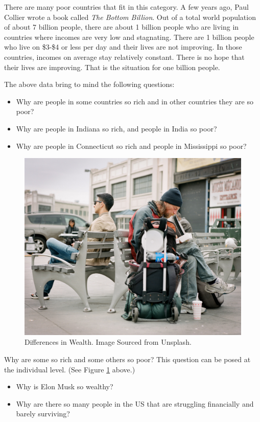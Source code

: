 \documentclass[
]{book}
\providecommand{\tightlist}{%
  \setlength{\itemsep}{0pt}\setlength{\parskip}{0pt}}
\begin{document}
There are many poor countries that fit in this category. A few years ago, Paul Collier wrote a book called \emph{The Bottom Billion}. Out of a total world population of about 7 billion people, there are about 1 billion people who are living in countries where incomes are very low and stagnating. There are 1 billion people who live on \$3-\$4 or less per day and their lives are not improving. In those countries, incomes on average stay relatively constant. There is no hope that their lives are improving. That is the situation for one billion people.

The above data bring to mind the following questions:

\begin{itemize}
\tightlist
\item
  Why are people in some countries so rich and in other countries they are so poor?
\item
  Why are people in Indiana so rich, and people in India so poor?
\item
  Why are people in Connecticut so rich and people in Mississippi so poor?
\end{itemize}

\begin{figure}

{\centering \includegraphics[width=0.5\linewidth]{img/ch1/fig1} 

}

\caption{Differences in Wealth. Image Sourced from Unsplash.}\label{fig:fig101}
\end{figure}

Why are some so rich and some others so poor? This question can be posed at the individual level. (See Figure \ref{fig:fig101} above.)

\begin{itemize}
\tightlist
\item
  Why is Elon Musk so wealthy?
\item
  Why are there so many people in the US that are struggling financially and barely surviving?
\end{itemize}
\end{document}
